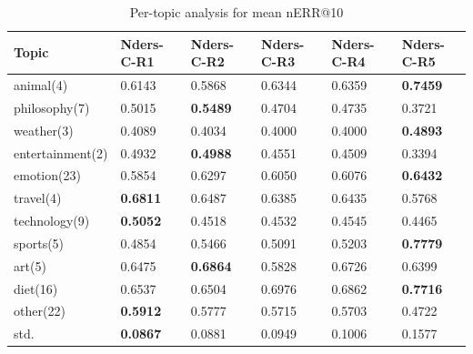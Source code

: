 \documentclass{sig-alternate}
\begin{document}
\begin{table}[]
\centering
\caption{Per-topic analysis for mean nERR@10}
\label{my-label}
\begin{tabular}{llllll}
\hline
Topic & Nders-C-R1 & Nders-C-R2 & Nders-C-R3 & Nders-C-R4 & Nders-C-R5 \\
\hline
animal(4) & 0.6143 & 0.5868 & 0.6344 & 0.6359 & \textbf{0.7459} \\
philosophy(7) & 0.5015 & \textbf{0.5489} & 0.4704 & 0.4735 & 0.3721 \\
weather(3) & 0.4089 & 0.4034 & 0.4000 & 0.4000 & \textbf{0.4893} \\
entertainment(2) & 0.4932 & \textbf{0.4988} & 0.4551 & 0.4509 & 0.3394 \\
emotion(23) & 0.5854 & 0.6297 & 0.6050 & 0.6076 & \textbf{0.6432} \\
travel(4) & \textbf{0.6811} & 0.6487 & 0.6385 & 0.6435 & 0.5768 \\
technology(9) & \textbf{0.5052} & 0.4518 & 0.4532 & 0.4545 & 0.4465 \\
sports(5) & 0.4854 & 0.5466 & 0.5091 & 0.5203 & \textbf{0.7779} \\
art(5) & 0.6475 & \textbf{0.6864} & 0.5828 & 0.6726 & 0.6399 \\
diet(16) & 0.6537 & 0.6504 & 0.6976 & 0.6862 & \textbf{0.7716} \\
other(22) & \textbf{0.5912} & 0.5777 & 0.5715 & 0.5703 & 0.4722 \\
\hline
std.   &   \textbf{0.0867} &  0.0881 &  0.0949 &  0.1006 &  0.1577 \\
\hline
\end{tabular}
\end{table}
\end{document}
